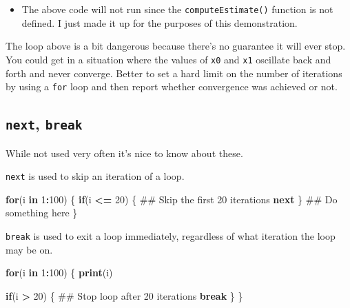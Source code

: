\documentclass[]{book}
\newenvironment{Shaded}{\begin{snugshade}}{\end{snugshade}}
\newcommand{\KeywordTok}[1]{\textcolor[rgb]{0.13,0.29,0.53}{\textbf{#1}}}
\newcommand{\DecValTok}[1]{\textcolor[rgb]{0.00,0.00,0.81}{#1}}
\newcommand{\StringTok}[1]{\textcolor[rgb]{0.31,0.60,0.02}{#1}}
\newcommand{\ControlFlowTok}[1]{\textcolor[rgb]{0.13,0.29,0.53}{\textbf{#1}}}
\newcommand{\OperatorTok}[1]{\textcolor[rgb]{0.81,0.36,0.00}{\textbf{#1}}}
\newcommand{\NormalTok}[1]{#1}
\newenvironment{rmdblock}[1]
  {\begin{shaded*}
  \begin{itemize}
  \renewcommand{\labelitemi}{
    \raisebox{-.7\height}[0pt][0pt]{
      {\setkeys{Gin}{width=3em,keepaspectratio}\texttt{[image: images/\#1]}}
    }
  }
  \item
  }
  {
  \end{itemize}
  \end{shaded*}
  }
\newenvironment{rmdnote}
  {\begin{rmdblock}{note}}
  {\end{rmdblock}}
\theoremstyle{definition}
\theoremstyle{definition}
\theoremstyle{definition}
\theoremstyle{remark}
\begin{document}
\begin{rmdnote}
The above code will not run since the \texttt{computeEstimate()}
function is not defined. I just made it up for the purposes of this
demonstration.
\end{rmdnote}

The loop above is a bit dangerous because there's no guarantee it will
ever stop. You could get in a situation where the values of \texttt{x0}
and \texttt{x1} oscillate back and forth and never converge. Better to
set a hard limit on the number of iterations by using a \texttt{for}
loop and then report whether convergence was achieved or not.

\subsection{\texorpdfstring{\texttt{next},
\texttt{break}}{next, break}}\label{next-break}

While not used very often it's nice to know about these.

\texttt{next} is used to skip an iteration of a loop.

\begin{Shaded}
\begin{Highlighting}[]
\ControlFlowTok{for}\NormalTok{(i }\ControlFlowTok{in} \DecValTok{1}\OperatorTok{:}\DecValTok{100}\NormalTok{) \{}
        \ControlFlowTok{if}\NormalTok{(i }\OperatorTok{<=}\StringTok{ }\DecValTok{20}\NormalTok{) \{}
\NormalTok{                ## Skip the first 20 iterations}
                \ControlFlowTok{next}                 
\NormalTok{        \}}
\NormalTok{        ## Do something here}
\NormalTok{\}}
\end{Highlighting}
\end{Shaded}

\texttt{break} is used to exit a loop immediately, regardless of what
iteration the loop may be on.

\begin{Shaded}
\begin{Highlighting}[]
\ControlFlowTok{for}\NormalTok{(i }\ControlFlowTok{in} \DecValTok{1}\OperatorTok{:}\DecValTok{100}\NormalTok{) \{}
      \KeywordTok{print}\NormalTok{(i)}

      \ControlFlowTok{if}\NormalTok{(i }\OperatorTok{>}\StringTok{ }\DecValTok{20}\NormalTok{) \{}
\NormalTok{              ## Stop loop after 20 iterations}
              \ControlFlowTok{break}  
\NormalTok{      \}     }
\NormalTok{\}}
\end{Highlighting}
\end{Shaded}
\end{document}
